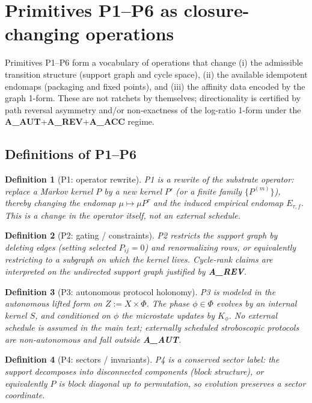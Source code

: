 \documentclass[11pt]{article}
\newtheorem{definition}{Definition}
\theoremstyle{remark}
\begin{document}
\section{Primitives P1--P6 as closure-changing operations}\label{sec:primitives}
Primitives P1--P6 form a vocabulary of operations that change (i) the admissible transition
structure (support graph and cycle space), (ii) the available idempotent endomaps (packaging and
fixed points), and (iii) the affinity data encoded by the graph 1-form. These are not ratchets by
themselves; directionality is certified by path reversal asymmetry and/or non-exactness of the
log-ratio 1-form under the \textbf{A\_AUT}+\textbf{A\_REV}+\textbf{A\_ACC} regime.

\subsection{Definitions of P1--P6}

\begin{definition}[P1: operator rewrite]
P1 is a rewrite of the substrate operator: replace a Markov kernel $P$ by a new kernel $P'$ (or a
finite family $\{P^{(m)}\}$), thereby changing the endomap $\mu\mapsto \mu P^\tau$ and the induced
empirical endomap $E_{\tau,f}$. This is a change in the operator itself, not an external schedule.
\end{definition}

\begin{definition}[P2: gating / constraints]
P2 restricts the support graph by deleting edges (setting selected $P_{ij}=0$) and renormalizing
rows, or equivalently restricting to a subgraph on which the kernel lives. Cycle-rank claims are
interpreted on the undirected support graph justified by \textbf{A\_REV}.
\end{definition}

\begin{definition}[P3: autonomous protocol holonomy]
P3 is modeled in the autonomous lifted form on $Z:=X\times\Phi$. The phase $\phi\in\Phi$ evolves
by an internal kernel $S$, and conditioned on $\phi$ the microstate updates by $K_\phi$.
No external schedule is assumed in the main text; externally scheduled stroboscopic protocols are
non-autonomous and fall outside \textbf{A\_AUT}.
\end{definition}

\begin{definition}[P4: sectors / invariants]
P4 is a conserved sector label: the support decomposes into disconnected components (block
structure), or equivalently $P$ is block diagonal up to permutation, so evolution preserves a
sector coordinate.
\end{definition}
\end{document}
